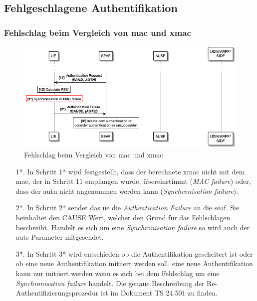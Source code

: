 \subsection{Fehlgeschlagene Authentifikation}

\subsubsection{Fehlschlag beim Vergleich von \gls{mac} und \gls{xmac}}

\begin{figure}[H]
  \centering
  \includegraphics[width=\textwidth]{uml/protocol_mac_failure_v1.png}
  \caption{Fehlschlag beim Vergleich von \gls{mac} und \gls{xmac}}
  \label{fig:protocol_mac_failure_v1}
\end{figure}

\begin{enumerate}
\item[1*.] In Schritt 1* wird festgestellt, dass der berechnete \gls{xmac} nicht mit dem \gls{mac}, der in Schritt 11 empfangen wurde, übereinstimmt (\textit{MAC failure}) oder, dass der \gls{autn} nicht angenommen werden kann (\textit{Synchronisation failure}).

\item[2*.] In Schritt 2* sendet das \gls{ue} die \textit{Authentication Failure} an die \gls{seaf}.
Sie beinhaltet den CAUSE Wert, welcher den Grund für das Fehlschlagen beschreibt.
Handelt es sich um eine \textit{Synchronisation failure} so wird auch der \gls{auts} Parameter mitgesendet.

\item[3*.] In Schritt 3* wird entschieden ob die Authentifikation gescheitert ist oder ob eine neue Authentifikation initiiert werden soll.
eine neue Authentifikation kann nur initiiert werden wenn es sich bei dem Fehlschlag um eine \textit{Synchronisation failure} handelt.
Die genaue Beschreibung der Re-Authentifizierungsprozedur ist im Dokument TS 24.501 zu finden. %
\end{enumerate}


